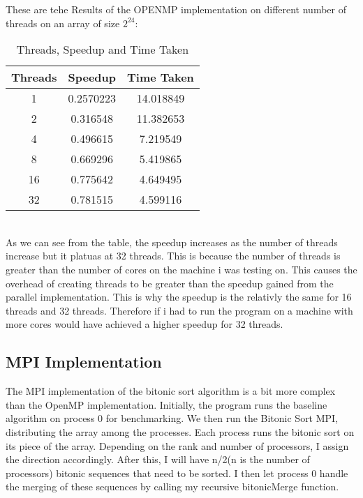 These are tehe Results of the OPENMP implementation on different number of
threads on an array of size  $2^{24}$:
\begin{table}[ht]
    \centering
    \setlength{\tabcolsep}{10pt} %
    \begin{tabular}{|c|c|c|}
        \hline
        \textbf{Threads} & \textbf{Speedup} & \textbf{Time Taken} \\
        \hline
        1                & 0.2570223        & 14.018849           \\
        2                & 0.316548         & 11.382653           \\
        4                & 0.496615         & 7.219549            \\
        8                & 0.669296         & 5.419865            \\
        16               & 0.775642         & 4.649495            \\
        32               & 0.781515         & 4.599116            \\
        \hline
    \end{tabular}
    \caption{Threads, Speedup and Time Taken}
    \label{table:1}
\end{table}\\
As we can see from the table, the speedup increases as the number of threads
increase but it platuas at 32 threads. This is because the number of threads is
greater than the number of cores on the machine i was testing on. This causes
the overhead of
creating threads to be greater than the speedup gained from the parallel
implementation. This is why the speedup is the relativly the same for 16
threads and 32 threads.
Therefore if i had to run the program on a machine with more cores would have
achieved a higher speedup for 32 threads.

\subsection{MPI Implementation}
The MPI implementation of the bitonic sort algorithm is a bit more complex than
the OpenMP implementation. Initially, the program runs the baseline algorithm
on process 0 for benchmarking. We then run the Bitonic Sort MPI, distributing
the array among the processes. Each process runs the bitonic sort on its piece
of the array. Depending on the rank and number of processors, I assign the
direction accordingly. After this, I will have n/2(n is the number of
processors) bitonic sequences that need
to be sorted. I then let process 0 handle the merging of these sequences by
calling my recursive bitonicMerge function.

